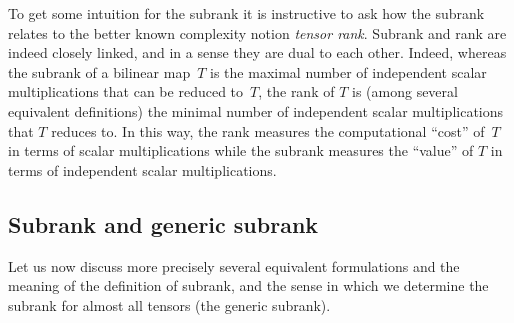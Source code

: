 \documentclass[10pt,a4paper]{article}
\theoremstyle{definition}
\theoremstyle{remark}
\begin{document}
%
To get some intuition for the subrank it is instructive to ask how the subrank relates to the better known complexity notion \emph{tensor rank}.
Subrank and rank are indeed closely linked, and in a sense they are dual to each other. Indeed, whereas the subrank of a bilinear map~$T$ is the maximal number of independent scalar multiplications that can be reduced to~$T$, the rank of $T$ is (among several equivalent definitions) the minimal number of independent scalar multiplications that $T$ reduces to. In this way, the rank measures the computational ``cost'' of~$T$ in terms of scalar multiplications while the subrank measures the ``value'' of $T$ in terms of independent scalar multiplications.

%

\subsection{Subrank and generic subrank}

Let us now discuss more precisely several equivalent formulations and the meaning of the definition of subrank, and the sense in which we determine the subrank for almost all tensors (the generic subrank).
\end{document}
